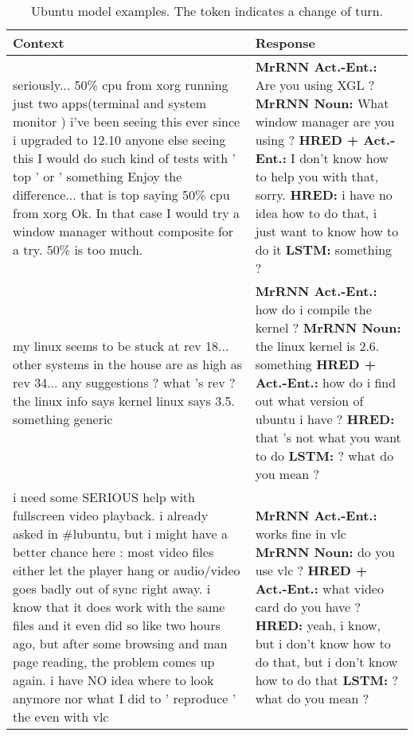 \documentclass{article}
\begin{document}
\begin{table}[ht]
 \caption{Ubuntu model examples. The  token indicates a change of turn.}
 \label{table:ubuntu-examples-first}
 \scriptsize
 \centering
 \begin{tabular}{p{65mm}|p{60mm}}
 \textbf{Context} & \textbf{Response} \\ \hline
seriously... 50\% cpu from xorg running just two apps(terminal and system monitor ) i've been seeing this ever since i upgraded to 12.10 anyone else seeing this  I would do such kind of tests with ' top ' or ' something Enjoy the difference...  that is top saying 50\% cpu from xorg  Ok. In that case I would try a window manager without composite for a try. 50\% is too much. & \textbf{MrRNN Act.\@ -Ent.\@:} Are you using XGL ? \newline \textbf{MrRNN Noun:} What window manager are you using ? \newline \textbf{HRED + Act.\@-Ent.\@:} I don't know how to help you with that, sorry. \newline \textbf{HRED:} i have no idea how to do that, i just want to know how to do it \newline \textbf{LSTM:} something ? \\ \hline 
        my linux seems to be stuck at rev 18... other systems in the house are as high as rev 34... any suggestions ?  what 's rev ?  the linux info says kernel linux says 3.5. something generic & \textbf{MrRNN Act.\@ -Ent.\@:} how do i compile the kernel ? \newline \textbf{MrRNN Noun:} the linux kernel is 2.6. something \newline \textbf{HRED + Act.\@-Ent.\@:} how do i find out what version of ubuntu i have ? \newline \textbf{HRED:} that 's not what you want to do \newline \textbf{LSTM:} ? what do you mean ? \\ \hline 
        i need some SERIOUS help with fullscreen video playback. i already asked in \#lubuntu, but i might have a better chance here : most video files either let the player hang or audio/video goes badly out of sync right away. i know that it does work with the same files and it even did so like two hours ago, but after some browsing and man page reading, the problem comes up again. i have NO idea where to look anymore nor what I did to ' reproduce ' the  even with vlc & \textbf{MrRNN Act.\@ -Ent.\@:} works fine in vlc \newline \textbf{MrRNN Noun:} do you use vlc ? \newline \textbf{HRED + Act.\@-Ent.\@:} what video card do you have ? \newline \textbf{HRED:} yeah, i know, but i don't know how to do that, but i don't know how to do that \newline \textbf{LSTM:} ? what do you mean ? \\ \hline 

\end{tabular}
\end{table}
\end{document}
